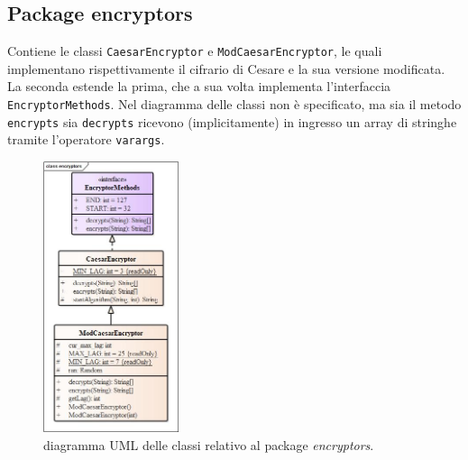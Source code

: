 \documentclass[a4paper, 12pt, one column, aas_macros]{article}
\begin{document}
	\subsection{Package encryptors}
	Contiene le classi \verb|CaesarEncryptor| e \verb|ModCaesarEncryptor|, le quali implementano rispettivamente il cifrario di Cesare e la sua versione modificata. La seconda estende la prima, che a sua volta implementa l'interfaccia \verb|EncryptorMethods|. Nel diagramma delle classi non è specificato, ma sia il metodo \verb|encrypts| sia \verb|decrypts| ricevono (implicitamente) in ingresso un array di stringhe tramite l'operatore \verb|varargs|.
	\begin{figure}[h!]
		\centering
		\includegraphics[height=300px]{UML/encryptors.jpg}
		\caption{diagramma UML delle classi relativo al package \textit{encryptors}.}
		\label{UML_ecryptors}
	\end{figure}
	
\end{document}
